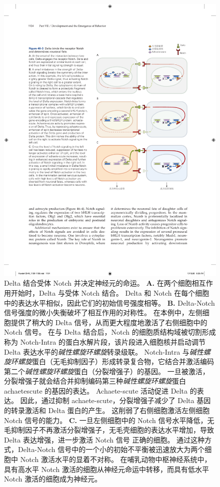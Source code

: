 \begin{figure}[htbp]
	\centering
	\includegraphics[width=0.75\linewidth]{chap46/fig_46_3}
	\caption{Delta 结合受体 Notch 并决定神经元的命运。
		\textbf{A.} 在两个细胞相互作用开始时，Delta 与受体 Notch 结合。
		Delta 和 Notch 在每个细胞中的表达水平相似，因此它们的初始信号强度相等。
		\textbf{B.} Delta-Notch 信号强度的微小失衡破坏了相互作用的对称性。
		在本例中，左侧细胞提供了稍大的 Delta 信号，从而更大程度地激活了右侧细胞中的 Notch 信号。
		在与 Delta 结合后，Notch 的细胞质结构域被切割形成称为 Notch-Intra 的蛋白水解片段，该片段进入细胞核并启动调节 Delta 表达水平的\textit{碱性螺旋环螺旋}转录级联。
		Notch-Intra 与\textit{碱性螺旋环螺旋}蛋白（无毛抑制因子）形成转录复合物，它结合并激活编码第二个\textit{碱性螺旋环螺旋}蛋白（分裂增强子）的基因。
		一旦被激活，分裂增强子就会结合并抑制编码第三种\textit{碱性螺旋环螺旋}蛋白 achaetescute 的基因的表达。
		Achaete-scute 活动促进 Delta 的表达。
		因此，通过抑制 achaete-scute，分裂增强子减少了 Delta 基因的转录激活和 Delta 蛋白的产生。
		这削弱了右侧细胞激活左侧细胞 Notch 信号的能力。
		\textbf{C.} 一旦左侧细胞中的 Notch 信号水平降低，无毛抑制因子不再激活分裂增强子，无毛壳细胞的表达水平增加，导致 Delta 表达增强，进一步激活 Notch 信号 正确的细胞。
		通过这种方式，Delta-Notch 信号中的一个小的初始不平衡被迅速放大为两个细胞中 Notch 激活水平的显着不对称。
		在哺乳动物中枢神经系统中，具有高水平 Notch 激活的细胞从神经元命运中转移，而具有低水平 Notch 激活的细胞成为神经元。}
	\label{fig:46_3}
\end{figure}


